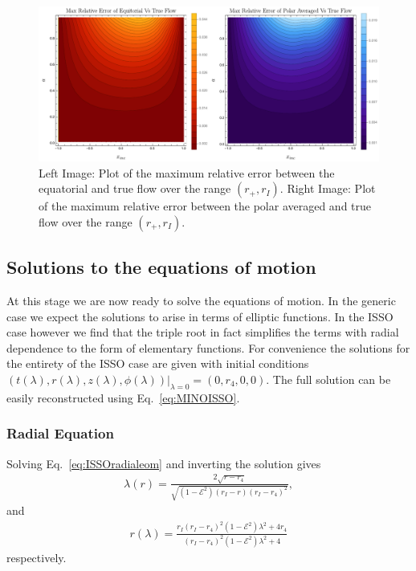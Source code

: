 \documentclass[12pt, amsmath]{revtex4-2}
\newcommand\lam{\lambda}
\newcommand\EN{\mathcal{E}}
\begin{document}
\begin{figure}[tb!]
    \centering
    \includegraphics[width=150mm]{ContourFLows.pdf}
        \caption{Left Image: Plot of the maximum relative error between the equatorial and true flow over the range $(r_+,r_I)$. Right Image: Plot of the maximum relative error between the polar averaged and true flow over the range $(r_+,r_I)$.}
    \label{fig:flowerrors}
\end{figure}


\subsection{Solutions to the equations of motion}
At this stage we are now ready to solve the equations of motion. In the generic case we expect the solutions to arise in terms of elliptic functions. In the ISSO case however we find that the triple root in fact simplifies the terms with radial dependence to the form of elementary functions. For convenience the solutions for the entirety of the ISSO case are given with initial conditions $(t(\lam),r(\lam),z(\lam),\phi(\lam))|_{\lam=0} =(0,r_4,0,0)$. The full solution can be easily reconstructed using Eq.~\eqref{eq:MINOISSO}.
\subsubsection{Radial Equation}
Solving Eq.~\eqref{eq:ISSOradialeom} and inverting the solution gives 
    \begin{align}\label{eq:MINOISSO}
        \lambda(r) = \frac{2\sqrt{r-r_4}}{\sqrt{(1-\EN^2)(r_I-r)(r_I-r_4)^2}},
    \end{align}
and
\begin{align}
        r(\lambda) = \frac{r_I(r_I-r_4)^2(1-\EN^2)\lambda^2+4r_4}{(r_I-r_4)^2(1-\EN^2)\lambda^2+4}
\end{align}
respectively.
\end{document}
